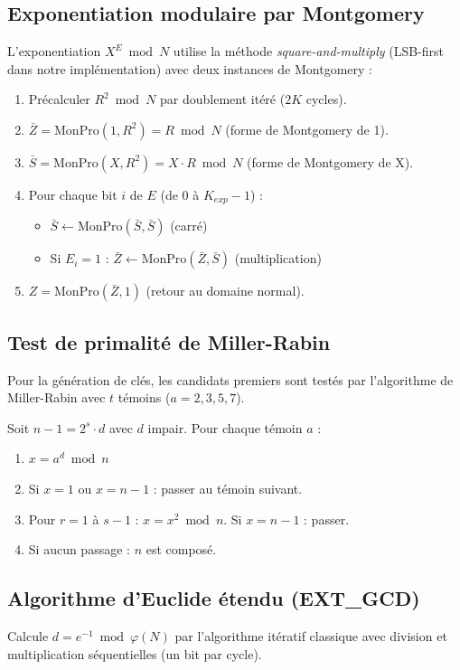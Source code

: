 \subsection{Exponentiation modulaire par Montgomery}

L'exponentiation $X^E \bmod N$ utilise la méthode \textit{square-and-multiply}
(LSB-first dans notre implémentation) avec deux instances de Montgomery :

\begin{enumerate}
  \item Précalculer $R^2 \bmod N$ par doublement itéré ($2K$ cycles).
  \item $\bar{Z} = \text{MonPro}(1, R^2) = R \bmod N$ (forme de Montgomery de 1).
  \item $\bar{S} = \text{MonPro}(X, R^2) = X \cdot R \bmod N$ (forme de
        Montgomery de X).
  \item Pour chaque bit $i$ de $E$ (de 0 à $K_{exp}-1$) :
  \begin{itemize}
    \item $\bar{S} \leftarrow \text{MonPro}(\bar{S}, \bar{S})$ \quad (carré)
    \item Si $E_i = 1$ : $\bar{Z} \leftarrow \text{MonPro}(\bar{Z}, \bar{S})$
          \quad (multiplication)
  \end{itemize}
  \item $Z = \text{MonPro}(\bar{Z}, 1)$ \quad (retour au domaine normal).
\end{enumerate}

\subsection{Test de primalité de Miller-Rabin}

Pour la génération de clés, les candidats premiers sont testés par
l'algorithme de Miller-Rabin avec $t$ témoins ($a = 2, 3, 5, 7$).

Soit $n - 1 = 2^s \cdot d$ avec $d$ impair. Pour chaque témoin $a$ :
\begin{enumerate}
  \item $x = a^d \bmod n$
  \item Si $x = 1$ ou $x = n-1$ : passer au témoin suivant.
  \item Pour $r = 1$ à $s-1$ : $x = x^2 \bmod n$. Si $x = n-1$ : passer.
  \item Si aucun passage : $n$ est composé.
\end{enumerate}

\subsection{Algorithme d'Euclide étendu (EXT\_GCD)}
Calcule $d = e^{-1} \bmod \varphi(N)$ par l'algorithme itératif classique
avec division et multiplication séquentielles (un bit par cycle).



